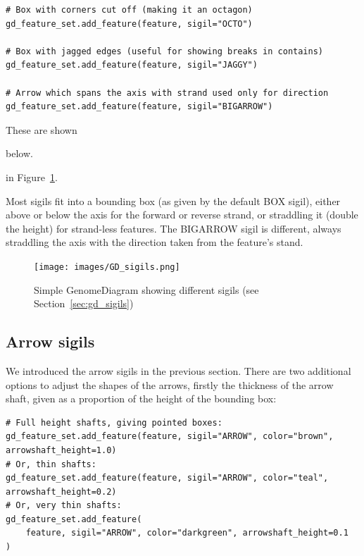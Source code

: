 \begin{verbatim}
# Box with corners cut off (making it an octagon)
gd_feature_set.add_feature(feature, sigil="OCTO")

# Box with jagged edges (useful for showing breaks in contains)
gd_feature_set.add_feature(feature, sigil="JAGGY")

# Arrow which spans the axis with strand used only for direction
gd_feature_set.add_feature(feature, sigil="BIGARROW")
\end{verbatim}

These are shown
\begin{htmlonly}
below.
\end{htmlonly}
\begin{latexonly}
in Figure~\ref{fig:gd_sigils}.
\end{latexonly}
Most sigils fit into a bounding box (as given by the default BOX sigil),
either above or below the axis for the forward or reverse strand, or
straddling it (double the height) for strand-less features.
The BIGARROW sigil is different, always straddling the axis with the
direction taken from the feature's stand.

\begin{htmlonly}
\end{htmlonly}
\begin{latexonly}
\begin{figure}[htbp]
\centering
\texttt{[image: images/GD\_sigils.png]}
\caption{Simple GenomeDiagram showing different sigils
(see Section~\ref{sec:gd_sigils})}
\label{fig:gd_sigils}
\end{figure}
\end{latexonly}

\subsection{Arrow sigils}
\label{sec:gd_arrow_sigils}

We introduced the arrow sigils in the previous section.
There are two additional options to adjust the shapes of the arrows, firstly
the thickness of the arrow shaft, given as a proportion of the height of the
bounding box:

\begin{verbatim}
# Full height shafts, giving pointed boxes:
gd_feature_set.add_feature(feature, sigil="ARROW", color="brown", arrowshaft_height=1.0)
# Or, thin shafts:
gd_feature_set.add_feature(feature, sigil="ARROW", color="teal", arrowshaft_height=0.2)
# Or, very thin shafts:
gd_feature_set.add_feature(
    feature, sigil="ARROW", color="darkgreen", arrowshaft_height=0.1
)
\end{verbatim}

